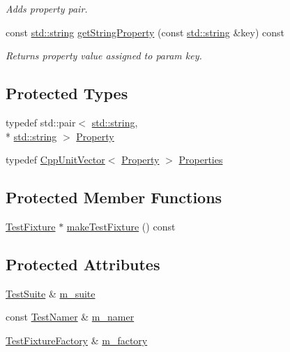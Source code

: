 \begin{DoxyCompactItemize}
\begin{DoxyCompactList}\small\item\em Adds property pair. \end{DoxyCompactList}\item 
const \hyperlink{glew_8h_ae84541b4f3d8e1ea24ec0f466a8c568b}{std\-::string} \hyperlink{class_test_suite_builder_context_base_a9955d3fda5115963ee0310d09a3b15d9}{get\-String\-Property} (const \hyperlink{glew_8h_ae84541b4f3d8e1ea24ec0f466a8c568b}{std\-::string} \&key) const 
\begin{DoxyCompactList}\small\item\em Returns property value assigned to param key. \end{DoxyCompactList}\end{DoxyCompactItemize}
\subsection*{Protected Types}
\begin{DoxyCompactItemize}
\item 
typedef std\-::pair$<$ \hyperlink{glew_8h_ae84541b4f3d8e1ea24ec0f466a8c568b}{std\-::string}, \\*
\hyperlink{glew_8h_ae84541b4f3d8e1ea24ec0f466a8c568b}{std\-::string} $>$ \hyperlink{class_test_suite_builder_context_base_a1e2319a53ecd7a718c87f4ea5c42d4c6}{Property}
\item 
typedef \hyperlink{_cpp_unit_vector_8h_ab1af16468212807e5cc231dc1ef32323}{Cpp\-Unit\-Vector}$<$ \hyperlink{class_test_suite_builder_context_base_a1e2319a53ecd7a718c87f4ea5c42d4c6}{Property} $>$ \hyperlink{class_test_suite_builder_context_base_a95565394a60a8b8d843a5a64d2572a86}{Properties}
\end{DoxyCompactItemize}
\subsection*{Protected Member Functions}
\begin{DoxyCompactItemize}
\item 
\hyperlink{class_test_fixture}{Test\-Fixture} $\ast$ \hyperlink{class_test_suite_builder_context_base_a5474060095c1ab76f16a133af0fb3b52}{make\-Test\-Fixture} () const 
\end{DoxyCompactItemize}
\subsection*{Protected Attributes}
\begin{DoxyCompactItemize}
\item 
\hyperlink{class_test_suite}{Test\-Suite} \& \hyperlink{class_test_suite_builder_context_base_a16ea2e4d82cd9f94b843839dc8ed2931}{m\-\_\-suite}
\item 
const \hyperlink{class_test_namer}{Test\-Namer} \& \hyperlink{class_test_suite_builder_context_base_abdbbb982c6c41ae8ecc5abe954c56e70}{m\-\_\-namer}
\item 
\hyperlink{class_test_fixture_factory}{Test\-Fixture\-Factory} \& \hyperlink{class_test_suite_builder_context_base_ad814ae6df45822300bf99dfcee0277f7}{m\-\_\-factory}
\end{DoxyCompactItemize}


